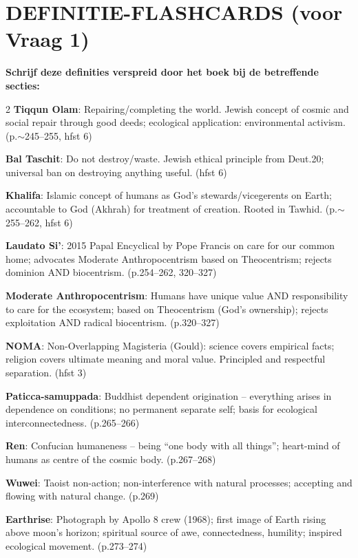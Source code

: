 \documentclass[a4paper,10pt]{article}
\begin{document}
\vspace{8pt}

\section{DEFINITIE-FLASHCARDS (voor Vraag 1)}

\textbf{Schrijf deze definities verspreid door het boek bij de betreffende secties:}

\begin{multicols}{2}
\textbf{Tiqqun Olam}: Repairing/completing the world. Jewish concept of cosmic and social repair through good deeds; ecological application: environmental activism. (p.$\sim$245--255, hfst 6)

\textbf{Bal Taschit}: Do not destroy/waste. Jewish ethical principle from Deut.20; universal ban on destroying anything useful. (hfst 6)

\textbf{Khalifa}: Islamic concept of humans as God's stewards/vicegerents on Earth; accountable to God (Akhrah) for treatment of creation. Rooted in Tawhid. (p.$\sim$255--262, hfst 6)

\textbf{Laudato Si'}: 2015 Papal Encyclical by Pope Francis on care for our common home; advocates Moderate Anthropocentrism based on Theocentrism; rejects dominion AND biocentrism. (p.254--262, 320--327)

\textbf{Moderate Anthropocentrism}: Humans have unique value AND responsibility to care for the ecosystem; based on Theocentrism (God's ownership); rejects exploitation AND radical biocentrism. (p.320--327)

\textbf{NOMA}: Non-Overlapping Magisteria (Gould): science covers empirical facts; religion covers ultimate meaning and moral value. Principled and respectful separation. (hfst 3)

\textbf{Paticca-samuppada}: Buddhist dependent origination -- everything arises in dependence on conditions; no permanent separate self; basis for ecological interconnectedness. (p.265--266)

\textbf{Ren}: Confucian humaneness -- being ``one body with all things''; heart-mind of humans as centre of the cosmic body. (p.267--268)

\textbf{Wuwei}: Taoist non-action; non-interference with natural processes; accepting and flowing with natural change. (p.269)

\textbf{Earthrise}: Photograph by Apollo 8 crew (1968); first image of Earth rising above moon's horizon; spiritual source of awe, connectedness, humility; inspired ecological movement. (p.273--274)


\end{multicols}
\end{document}
